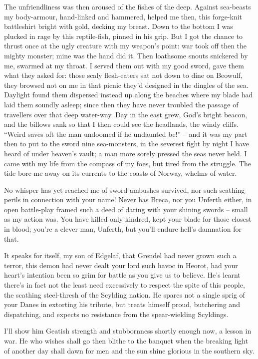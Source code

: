 \documentclass[a4paper]{article}
\begin{document}
{The unfriendliness was then aroused of the fishes of the deep.
Against sea-beasts my body-armour,
hand-linked and hammered, helped me then,
this forge-knit battleshirt bright with gold,
decking my breast. Down to the bottom
I was plucked in rage by this reptile-fish,
pinned in his grip. But I got the chance
to thrust once at the ugly creature
with my weapon’s point: war took off then
the mighty monster; mine was the hand did it.
Then loathsome snouts snickered by me,
swarmed at my throat. I served them out
with my good sword, gave them what they asked for:
those scaly flesh-eaters sat not down
to dine on Beowulf, they browsed not on me
in that picnic they’d designed in the dingles of the sea.
Daylight found them dispersed instead
up along the beaches where my blade had laid them
soundly asleep; since then they have never
troubled the passage of travellers over
that deep water-way. Day in the east grew,
God’s bright beacon, and the billows sank
so that I then could see the headlands,
the windy cliffs. “Weird saves oft
the man undoomed if he undaunted be!” –
and it was my part then to put to the sword
nine sea-monsters, in the severest fight
by night I have heard of under heaven’s vault;
a man more sorely pressed the seas never held.
I came with my life from the compass of my foes,
but tired from the struggle. The tide bore me
away on its currents to the coasts of Norway,
whelms of water.

No whisper has yet reached me
of sword-ambushes survived, nor such scathing perils
in connection with your name! Never has Breca,
nor you Unferth either, in open battle-play
framed such a deed of daring with your
shining swords – small as my action was.
You have killed only kindred, kept your blade
for those closest in blood; you’re a clever man, Unferth,
but you’ll endure hell’s damnation for that.

It speaks for itself, my son of Edgelaf,
that Grendel had never grown such a terror,
this demon had never dealt your lord
such havoc in Heorot, had your heart’s intention
been so grim for battle as you give us to believe.
He’s learnt there’s in fact not the least need
excessively to respect the spite of this people,
the scathing steel-thresh of the Scylding nation.
He spares not a single sprig of your Danes
in extorting his tribute, but treats himself proud,
butchering and dispatching, and expects no resistance
from the spear-wielding Scyldings.

I’ll show him Geatish
strength and stubbornness shortly enough now,
a lesson in war. He who wishes shall go then
blithe to the banquet when the breaking light
of another day shall dawn for men
and the sun shine glorious in the southern sky.

}
\end{document}
